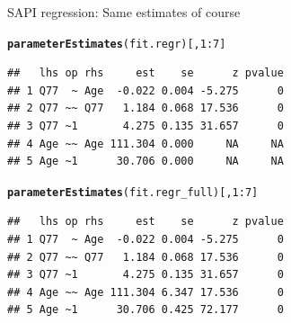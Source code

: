 \documentclass[10pt]{beamer}\usepackage[]{graphicx}\usepackage[]{xcolor}
\makeatletter
\newcommand{\hlnum}[1]{\textcolor[rgb]{0.686,0.059,0.569}{#1}}%
\newcommand{\hlopt}[1]{\textcolor[rgb]{0,0,0}{#1}}%
\newcommand{\hlstd}[1]{\textcolor[rgb]{0.345,0.345,0.345}{#1}}%
\newcommand{\hlkwd}[1]{\textcolor[rgb]{0.737,0.353,0.396}{\textbf{#1}}}%
\newenvironment{kframe}{%
 \def\at@end@of@kframe{}%
 \ifinner\ifhmode%
  \def\at@end@of@kframe{\end{minipage}}%
  \begin{minipage}{\columnwidth}%
 \fi\fi%
 \def\FrameCommand##1{\hskip\@totalleftmargin \hskip-\fboxsep
 \colorbox{shadecolor}{##1}\hskip-\fboxsep
     \hskip-\linewidth \hskip-\@totalleftmargin \hskip\columnwidth}%
 \MakeFramed {\advance\hsize-\width
   \@totalleftmargin\z@ \linewidth\hsize
   \@setminipage}}%
 {\par\unskip\endMakeFramed%
 \at@end@of@kframe}
\newenvironment{knitrout}{}{} %
\makeatother
\begin{document}
%
\begin{frame}[fragile]{SAPI regression: Same estimates of course}

\begin{knitrout}
\color{fgcolor}\begin{kframe}
\begin{alltt}
\hlkwd{parameterEstimates}\hlstd{(fit.regr)[,}\hlnum{1}\hlopt{:}\hlnum{7}\hlstd{]}
\end{alltt}
\begin{verbatim}
##   lhs op rhs     est    se      z pvalue
## 1 Q77  ~ Age  -0.022 0.004 -5.275      0
## 2 Q77 ~~ Q77   1.184 0.068 17.536      0
## 3 Q77 ~1       4.275 0.135 31.657      0
## 4 Age ~~ Age 111.304 0.000     NA     NA
## 5 Age ~1      30.706 0.000     NA     NA
\end{verbatim}
\end{kframe}
\end{knitrout}

\begin{knitrout}
\color{fgcolor}\begin{kframe}
\begin{alltt}
\hlkwd{parameterEstimates}\hlstd{(fit.regr_full)[,}\hlnum{1}\hlopt{:}\hlnum{7}\hlstd{]}
\end{alltt}
\begin{verbatim}
##   lhs op rhs     est    se      z pvalue
## 1 Q77  ~ Age  -0.022 0.004 -5.275      0
## 2 Q77 ~~ Q77   1.184 0.068 17.536      0
## 3 Q77 ~1       4.275 0.135 31.657      0
## 4 Age ~~ Age 111.304 6.347 17.536      0
## 5 Age ~1      30.706 0.425 72.177      0
\end{verbatim}
\end{kframe}
\end{knitrout}
\end{frame}
%
\end{document}
